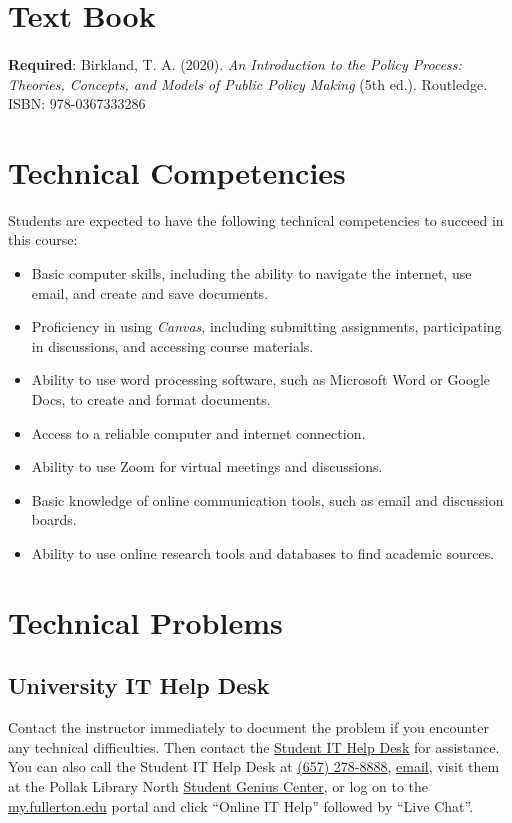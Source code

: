 \documentclass[11pt, letterpaper]{article}
\begin{document}
\section{Text Book}

\paragraph{}\noindent \textbf{Required}: Birkland, T. A. (2020). \emph{An Introduction to the Policy Process: Theories, Concepts, and Models of Public Policy Making} (5th ed.). Routledge. ISBN: 978-0367333286

\section{Technical Competencies}

Students are expected to have the following technical competencies to succeed in this course:
\begin{itemize}
    \item Basic computer skills, including the ability to navigate the internet, use email, and create and save documents.
    \item Proficiency in using \emph{Canvas}, including submitting assignments, participating in discussions, and accessing course materials.
    \item Ability to use word processing software, such as Microsoft Word or Google Docs, to create and format documents.
    \item Access to a reliable computer and internet connection.
    \item Ability to use Zoom for virtual meetings and discussions.
    \item Basic knowledge of online communication tools, such as email and discussion boards.
    \item Ability to use online research tools and databases to find academic sources.
\end{itemize}

\section{Technical Problems}

\subsection*{University IT Help Desk}

Contact the instructor immediately to document the problem if you encounter any technical difficulties. Then contact the \href{http://www.fullerton.edu/it/students/helpdesk/index.php}{Student IT Help Desk} for assistance. You can also call the Student IT Help Desk at \href{tel:+16572788888}{(657) 278-8888}, \href{mailto:StudentITHelpDesk@fullerton.edu}{email}, visit them at the Pollak Library North \href{http://www.fullerton.edu/it/students/sgc/index.php}{Student Genius Center}, or log on to the \href{http://my.fullerton.edu/}{my.fullerton.edu} portal and click ``Online IT Help'' followed by ``Live Chat''.
\end{document}
